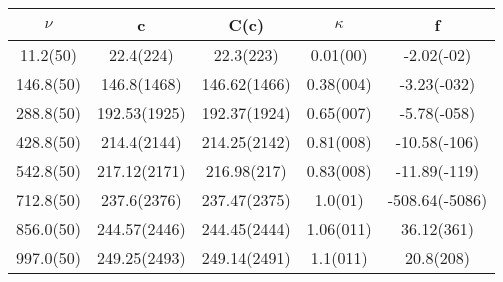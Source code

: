 \begin{table}[H]
	\centering
	\begin{tabular}{ccccc}
		$\nu$ & c & C(c) & $\kappa$ & f\\
		\hline
		11.2(50) & 22.4(224) & 22.3(223) & 0.01(00) & -2.02(-02)	\\
		146.8(50) & 146.8(1468) & 146.62(1466) & 0.38(004) & -3.23(-032)	\\
		288.8(50) & 192.53(1925) & 192.37(1924) & 0.65(007) & -5.78(-058)	\\
		428.8(50) & 214.4(2144) & 214.25(2142) & 0.81(008) & -10.58(-106)	\\
		542.8(50) & 217.12(2171) & 216.98(217) & 0.83(008) & -11.89(-119)	\\
		712.8(50) & 237.6(2376) & 237.47(2375) & 1.0(01) & -508.64(-5086)	\\
		856.0(50) & 244.57(2446) & 244.45(2444) & 1.06(011) & 36.12(361)	\\
		997.0(50) & 249.25(2493) & 249.14(2491) & 1.1(011) & 20.8(208)	\\
	\end{tabular}
\end{table}